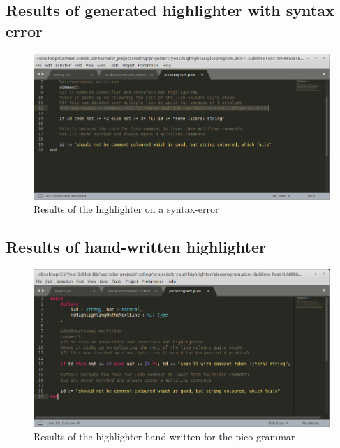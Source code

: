 \subsection{Results of generated highlighter with syntax error}
\begin{figure}[h]
	\centering
	\includegraphics[width=\textwidth, keepaspectratio]{Figures/highlightShots/pico_syntaxError_generated.png}
	\decoRule
 	\caption[Generated highlighter results for Pico grammar with syntax error]{Results of the highlighter on a syntax-error}
 	\label{fig:pico:highlighter:generated:error}
\end{figure}

\pagebreak\subsection{Results of hand-written highlighter}
\begin{figure}[h]
	\centering
	\includegraphics[width=\textwidth, keepaspectratio]{Figures/highlightShots/pico_handwritten.png}
	\decoRule
 	\caption[Hand-written highlighter results for Pico grammar]{Results of the highlighter hand-written for the pico grammar}
 	\label{fig:pico:highlighter:written}
\end{figure}